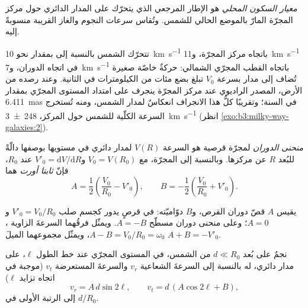 \begin{definition}\label{def:b3:milky-way-galaxies:lsr}
\emph{معيار السكون المحلي}  هو
الإطار المرجعي الذي يتحرّك على المدار الدائري حول مركز المجرّة
المارّ بالموضع الحالي للشمس. وتُقاس سرعات النجوم والغاز القريبة
منسوبةً إليه.
\end{definition}

تتحرّك الشمس بالنسبة إلى  بمقدار نحو \qty{10}{km.s^{-1}} باتجاه
مركز المجرّة، و\qty{11}{km.s^{-1}} في اتجاه الدوران،
و\qty{7}{km.s^{-1}} باتجاه القطب المجرّي الشمالي: حركةٌ خاصّة صغيرة
تُضاف إلى مدار بسرعة $V_0$ تبلغ بضع مئات من الكيلومترات
في الثانية. وعند رصده من الأرض، المصدر الراديوي عند مركز
المجرّة ينجرف على امتداد المستوى المجرّي بمقدار \qty{6.411}{mas} في السنة؛ وتقريبًا
كلُّ هذا الانجراف انعكاسٌ لمدار الشمس، ومنه تُستخرج السرعة
الكلّية للشمس حول المركز، \qty[separate-uncertainty=true]{248 \pm 3}{km.s^{-1}}
(انظر \cref{exo:b3:milky-way-galaxies:2}).

\begin{definition}\label{def:b3:milky-way-galaxies:rotation-curve}
\emph{منحنى الدوران} لمجرّة قرصية هو
السرعة $V(R)$ لمدار دائري في مستويها بوصفها دالّةً للبُعد
$R$ عن مركزها. وبالنسبة إلى المجرّة، مع $V_0 = V(R_0)$
و$V'_0 = \mathrm{d}V/\mathrm{d}R$ عند $R_0$، فإنّ \emph{ثابتا
أورت} هما
\[
A = \frac12\left(\frac{V_0}{R_0} - V'_0\right), \qquad
B = -\frac12\left(\frac{V_0}{R_0} + V'_0\right).
\]
\end{definition}

يقيس $A$ قصّ دوران القرص، و$B$ دوّاميّته: في
قرصٍ يدور كجسم صلب $V'_0 = V_0/R_0$ و$A = 0$؛ وعلى منحنى دوران مسطّح
$A = -B$. ويمثّل فرقُهما السرعةَ الزاوية ،
$A - B = V_0/R_0 = \omega_0$، ويمثّل مجموعهما الميلَ $A + B = -V'_0$.

\begin{theorem}\label{thm:b3:milky-way-galaxies:oort}
نجمٌ على بُعد $d \ll R_0$ من الشمس، في المستوى المجرّي عند
خط الطول $\ell$، على مدار دائري، له بالنسبة إلى  السرعةَ الشعاعية
$v_r$ والسرعةَ المستعرضة $v_t$ (موجبة في
اتجاه تزايد $\ell$)
\[
v_r = A\,d\sin 2\ell, \qquad v_t = d\,(A\cos 2\ell + B),
\]
إلى الرتبة الأولى في $d/R_0$.
\end{theorem}

